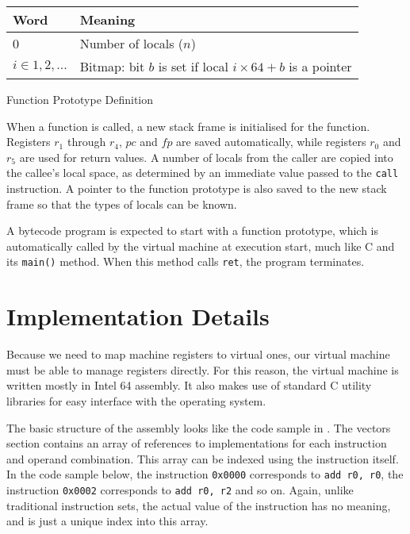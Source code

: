 		\begin{myfigure}
			\begin{tabular}{|l|l| }
				\hline
				Word & Meaning \\
				\hline
				0 & Number of locals ($n$) \\
				\hline
				$i \in 1, 2, ...$ & Bitmap: bit $b$ is set if local $i\times64 + b$ is a pointer \\
				\hline
			\end{tabular}
			\caption{Function Prototype Definition}
			\label{fig:funcproto}
		\end{myfigure}
		
		When a function is called, a new stack frame is initialised for the function. Registers $r_1$ through $r_4$, $pc$ and $fp$ are saved automatically, while registers $r_0$ and $r_5$ are used for return values. A number of locals from the caller are copied into the callee's local space, as determined by an immediate value passed to the \texttt{call} instruction. A pointer to the function prototype is also saved to the new stack frame so that the types of locals can be known.
		
		A bytecode program is expected to start with a function prototype, which is automatically called by the virtual machine at execution start, much like C and its \texttt{main()} method. When this method calls \texttt{ret}, the program terminates.
		
	\section{Implementation Details}
		Because we need to map machine registers to virtual ones, our virtual machine must be able to manage registers directly. For this reason, the virtual machine is written mostly in Intel 64 assembly. It also makes use of standard C utility libraries for easy interface with the operating system.
		
		The basic structure of the assembly looks like the code sample in . The vectors section contains an array of references to implementations for each instruction and operand combination. This array can be indexed using the instruction itself. In the code sample below, the instruction \texttt{0x0000} corresponds to \texttt{add r0, r0}, the instruction \texttt{0x0002} corresponds to \texttt{add r0, r2} and so on. Again, unlike traditional instruction sets, the actual value of the instruction has no meaning, and is just a unique index into this array.
		
